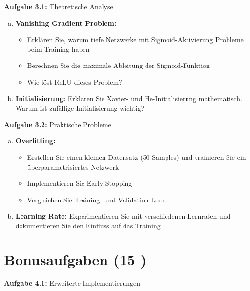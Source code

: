 ﻿\documentclass[12pt,a4paper]{article}
\begin{document}
\textbf{Aufgabe 3.1:} Theoretische Analyse 

\begin{enumerate}[(a)]
    \item \textbf{Vanishing Gradient Problem:} 
    \begin{itemize}
        \item Erklären Sie, warum tiefe Netzwerke mit Sigmoid-Aktivierung Probleme beim Training haben 
        \item Berechnen Sie die maximale Ableitung der Sigmoid-Funktion 
        \item Wie löst ReLU dieses Problem? 
    \end{itemize}
    
    \item \textbf{Initialisierung:} Erklären Sie Xavier- und He-Initialisierung mathematisch. Warum ist zufällige Initialisierung wichtig? 
\end{enumerate}

\textbf{Aufgabe 3.2:} Praktische Probleme 

\begin{enumerate}[(a)]
    \item \textbf{Overfitting:} 
    \begin{itemize}
        \item Erstellen Sie einen kleinen Datensatz (50 Samples) und trainieren Sie ein überparametrisiertes Netzwerk 
        \item Implementieren Sie Early Stopping 
        \item Vergleichen Sie Training- und Validation-Loss 
    \end{itemize}
    
    \item \textbf{Learning Rate:} Experimentieren Sie mit verschiedenen Lernraten und dokumentieren Sie den Einfluss auf das Training 
\end{enumerate}

\section{Bonusaufgaben (15 )}

\textbf{Aufgabe 4.1:} Erweiterte Implementierungen 
\end{document}
